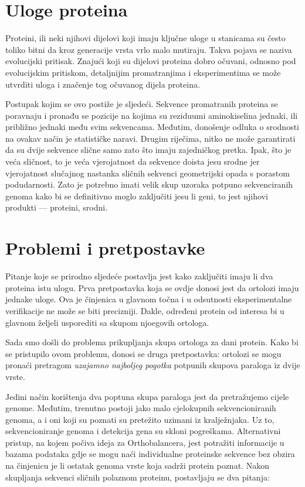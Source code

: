 \section{Uloge proteina}
\label{sec:uloge}

Proteini, ili neki njihovi dijelovi koji imaju ključne uloge u stanicama su
često toliko bitni da kroz generacije vrsta vrlo malo mutiraju. Takva pojava se
naziva evolucijski pritisak. Znajući koji su dijelovi proteina dobro očuvani,
odnosno pod evolucijskim pritiskom, detaljnijim promatranjima i eksperimentima
se može utvrditi uloga i značenje tog očuvanog dijela proteina.

Postupak kojim se ovo postiže je sljedeći. Sekvence promatranih proteina se
poravnaju i pronađu se pozicije na kojima su reziduumi aminokiselina jednaki,
ili približno jednaki među svim sekvencama. Međutim, donošenje odluka o
srodnosti na ovakav način je statističke naravi. Drugim riječima, nitko ne može
garantirati da su dvije sekvence slične samo zato što imaju zajedničkog pretka.
Ipak, što je veća sličnost, to je veća vjerojatnost da sekvence doista jesu
srodne jer vjerojatnost slučajnog nastanka sličnih sekvenci geometrijski opada s
porastom podudarnosti. Zato je potrebno imati velik skup uzoraka potpuno
sekvenciranih genoma kako bi se definitivno moglo zaključiti jesu li geni, to
jest njihovi produkti --- proteini, srodni.


\section{Problemi i pretpostavke}
\label{sec:pp}

Pitanje koje se prirodno sljedeće postavlja jest kako zaključiti imaju li dva
proteina istu ulogu. Prva pretpostavka koja se ovdje donosi jest da ortolozi
imaju jednake uloge. Ova je činjenica u glavnom točna i u odsutnosti
eksperimentalne verifikacije ne može se biti precizniji. Dakle, određeni protein
od interesa bi u glavnom željeli usporediti sa skupom njoegovih ortologa.

Sada smo došli do problema prikupljanja skupa ortologa za dani protein. Kako bi
se pristupilo ovom problemu, donosi se druga pretpostavka: ortolozi se mogu
pronaći pretragom \emph{uzajamno najboljeg pogotka} potpunih skupova paraloga iz
dvije vrste.

Jedini način korištenja dva poptuna skupa paraloga jest da pretražujemo cijele
genome. Međutim, trenutno postoji jako malo cjelokupnih sekvencioniranih genoma,
a i oni koji su poznati su pretežito uzimani iz kralježnjaka. Uz to,
sekvencioniranje genoma i detekcija gena su skloni pogreškama. Alternativni
pristup, na kojem počiva ideja za Orthobalancera, jest potražiti informacije u
bazama podataka gdje se mogu naći individualne proteinske sekvence bez obzira na
činjenicu je li ostatak genoma vrste koja sadrži protein poznat. Nakon
skupljanja sekvenci sličnih polaznom proteinu, postavljaju se dva pitanja:

